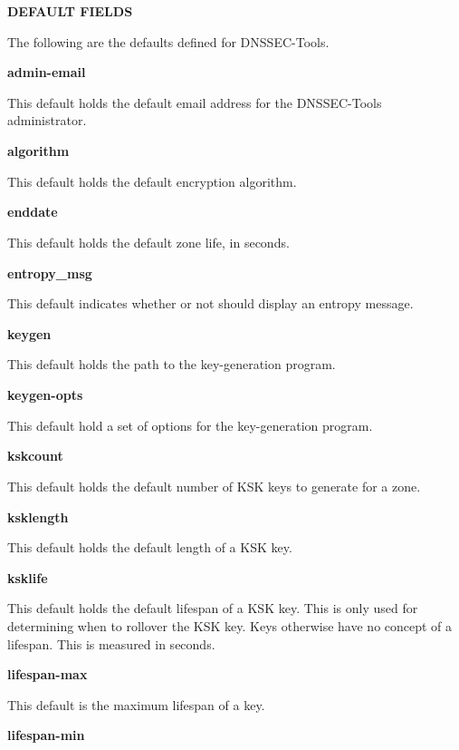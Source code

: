 {\bf DEFAULT FIELDS}

The following are the defaults defined for DNSSEC-Tools.

\begin{description}

\item {\bf admin-email}\verb" "

This default holds the default email address for the DNSSEC-Tools
administrator.

\item {\bf algorithm}\verb" "

This default holds the default encryption algorithm.

\item {\bf enddate}\verb" "

This default holds the default zone life, in seconds.

\item {\bf entropy\_msg}\verb" "

This default indicates whether or not  should display an
entropy message.

\item {\bf keygen}\verb" "

This default holds the path to the key-generation program.

\item {\bf keygen-opts}\verb" "

This default hold a set of options for the key-generation program.

\item {\bf kskcount}\verb" "

This default holds the default number of KSK keys to generate for a zone.

\item {\bf ksklength}\verb" "

This default holds the default length of a KSK key.

\item {\bf ksklife}\verb" "

This default holds the default lifespan of a KSK key.  This is only used
for determining when to rollover the KSK key.  Keys otherwise have no
concept of a lifespan.  This is measured in seconds.

\item {\bf lifespan-max}\verb" "

This default is the maximum lifespan of a key.

\item {\bf lifespan-min}\verb" "


\end{description}
